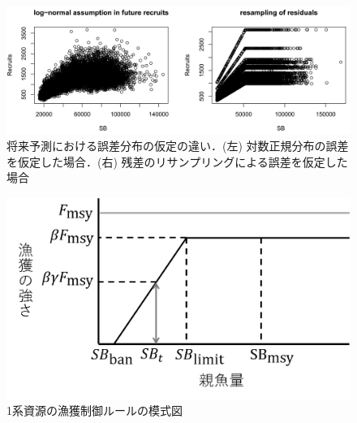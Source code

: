 \documentclass[11pt]{jsarticle}
\begin{document}
\begin{figure}[h]
  \includegraphics[bb=0 0 600 300, width=13cm]{fig_resample.png}
  \caption{将来予測における誤差分布の仮定の違い．(左) 対数正規分布の誤差を仮定した場合．(右) 残差のリサンプリングによる誤差を仮定した場合}
  \label{fig_resample}
\end{figure}

\begin{figure}[h]
  \includegraphics[bb=0 0 600 300, width=13cm]{fig_HCR.png}
  \caption{1系資源の漁獲制御ルールの模式図}
  \label{fig_HCR}
\end{figure}
\end{document}
